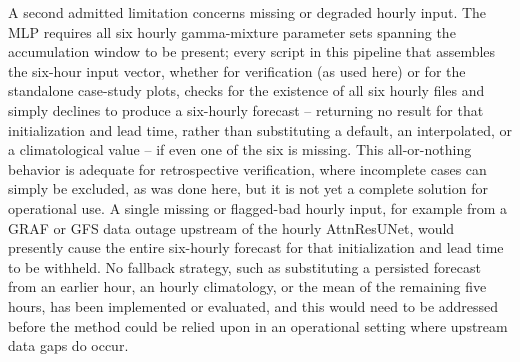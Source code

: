 \documentclass[11pt]{article}
\begin{document}
A second admitted limitation concerns missing or degraded hourly input.
The MLP requires all six hourly gamma-mixture parameter sets spanning the
accumulation window to be present; every script in this pipeline that
assembles the six-hour input vector, whether for verification (as used
here) or for the standalone case-study plots, checks for the existence of
all six hourly files and simply declines to produce a six-hourly forecast
-- returning no result for that initialization and lead time, rather than
substituting a default, an interpolated, or a climatological value -- if
even one of the six is missing.  This all-or-nothing behavior is adequate
for retrospective verification, where incomplete cases can simply be
excluded, as was done here, but it is not yet a complete solution for
operational use.  A single missing or flagged-bad hourly input, for
example from a GRAF or GFS data outage upstream of the hourly AttnResUNet,
would presently cause the entire six-hourly forecast for that
initialization and lead time to be withheld.  No fallback strategy, such as
substituting a persisted forecast from an earlier hour, an hourly
climatology, or the mean of the remaining five hours, has been implemented
or evaluated, and this would need to be addressed before the method could
be relied upon in an operational setting where upstream data gaps do
occur.



\end{document}
